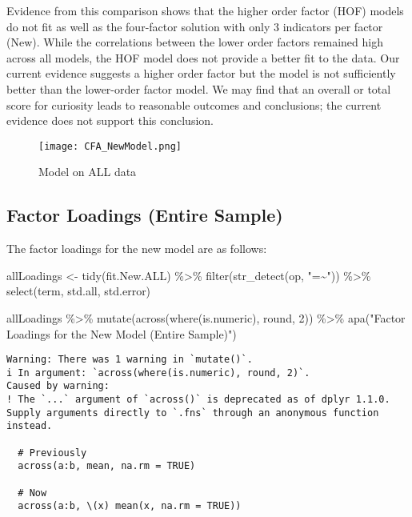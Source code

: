 \documentclass[
  letterpaper,
  DIV=11,
  numbers=noendperiod]{scrartcl}
\newenvironment{Shaded}{\begin{snugshade}}{\end{snugshade}}
\newcommand{\DecValTok}[1]{\textcolor[rgb]{0.68,0.00,0.00}{#1}}
\newcommand{\FunctionTok}[1]{\textcolor[rgb]{0.28,0.35,0.67}{#1}}
\newcommand{\NormalTok}[1]{\textcolor[rgb]{0.00,0.23,0.31}{#1}}
\newcommand{\OtherTok}[1]{\textcolor[rgb]{0.00,0.23,0.31}{#1}}
\newcommand{\SpecialCharTok}[1]{\textcolor[rgb]{0.37,0.37,0.37}{#1}}
\newcommand{\StringTok}[1]{\textcolor[rgb]{0.13,0.47,0.30}{#1}}
\begin{document}
Evidence from this comparison shows that the higher order factor (HOF)
models do not fit as well as the four-factor solution with only 3
indicators per factor (New). While the correlations between the lower
order factors remained high across all models, the HOF model does not
provide a better fit to the data. Our current evidence suggests a higher
order factor but the model is not sufficiently better than the
lower-order factor model. We may find that an overall or total score for
curiosity leads to reasonable outcomes and conclusions; the current
evidence does not support this conclusion.

\begin{figure}[H]

{\centering \texttt{[image: CFA\_NewModel.png]}

}

\caption{Model on ALL data}

\end{figure}%

\subsection{Factor Loadings (Entire
Sample)}\label{factor-loadings-entire-sample}

The factor loadings for the new model are as follows:

\begin{Shaded}
\begin{Highlighting}[]
\NormalTok{allLoadings }\OtherTok{\textless{}{-}} \FunctionTok{tidy}\NormalTok{(fit.New.ALL) }\SpecialCharTok{\%\textgreater{}\%}
  \FunctionTok{filter}\NormalTok{(}\FunctionTok{str\_detect}\NormalTok{(op, }\StringTok{"=\textasciitilde{}"}\NormalTok{)) }\SpecialCharTok{\%\textgreater{}\%}
  \FunctionTok{select}\NormalTok{(term, std.all, std.error)}

\NormalTok{allLoadings }\SpecialCharTok{\%\textgreater{}\%}
  \FunctionTok{mutate}\NormalTok{(}\FunctionTok{across}\NormalTok{(}\FunctionTok{where}\NormalTok{(is.numeric), round, }\DecValTok{2}\NormalTok{)) }\SpecialCharTok{\%\textgreater{}\%}
  \FunctionTok{apa}\NormalTok{(}\StringTok{"Factor Loadings for the New Model (Entire Sample)"}\NormalTok{)}
\end{Highlighting}
\end{Shaded}

\begin{verbatim}
Warning: There was 1 warning in `mutate()`.
i In argument: `across(where(is.numeric), round, 2)`.
Caused by warning:
! The `...` argument of `across()` is deprecated as of dplyr 1.1.0.
Supply arguments directly to `.fns` through an anonymous function instead.

  # Previously
  across(a:b, mean, na.rm = TRUE)

  # Now
  across(a:b, \(x) mean(x, na.rm = TRUE))
\end{verbatim}
\end{document}
